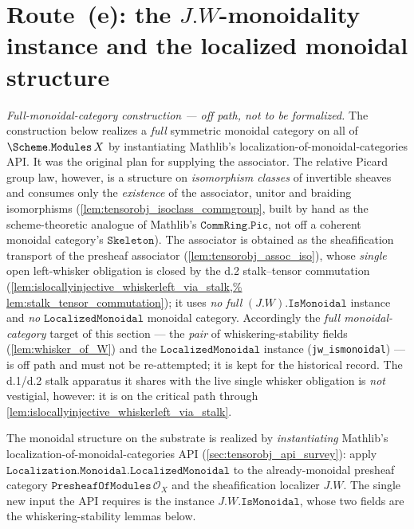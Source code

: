 \section{Route~(e): the \(J.W\)-monoidality instance and the localized monoidal structure}
\label{sec:tensorobj_route_e}

\emph{Full-monoidal-category construction --- off path, not to be formalized.} The
construction below realizes a \emph{full} symmetric monoidal category on all of
\(\Scheme.\mathtt{Modules}\,X\) by instantiating Mathlib's
localization-of-monoidal-categories API. It was the original plan for supplying the
associator. The relative Picard group law, however, is a structure on
\emph{isomorphism classes} of invertible sheaves and consumes only the
\emph{existence} of the associator, unitor and braiding isomorphisms
(\cref{lem:tensorobj_isoclass_commgroup}, built by hand as the scheme-theoretic
analogue of Mathlib's \(\mathtt{CommRing.Pic}\), not off a coherent monoidal
category's \(\mathtt{Skeleton}\)). The associator is obtained as the sheafification
transport of the presheaf associator (\cref{lem:tensorobj_assoc_iso}), whose
\emph{single} open left-whisker obligation is closed by the d.2 stalk--tensor
commutation (\cref{lem:islocallyinjective_whiskerleft_via_stalk,%
lem:stalk_tensor_commutation}); it uses \emph{no} \emph{full}
\((J.W).\mathtt{IsMonoidal}\) instance and \emph{no} \(\mathtt{LocalizedMonoidal}\)
monoidal category. Accordingly the \emph{full monoidal-category} target of this
section --- the \emph{pair} of whiskering-stability fields (\cref{lem:whisker_of_W})
and the \(\mathtt{LocalizedMonoidal}\) instance (\texttt{jw\_ismonoidal}) --- is off
path and must not be re-attempted; it is kept for the historical record. The d.1/d.2
stalk apparatus it shares with the live single whisker obligation is \emph{not}
vestigial, however: it is on the critical path through
\cref{lem:islocallyinjective_whiskerleft_via_stalk}.

The monoidal structure on the substrate is realized by \emph{instantiating}
Mathlib's localization-of-monoidal-categories API
(\cref{sec:tensorobj_api_survey}): apply
\(\mathtt{Localization.Monoidal.LocalizedMonoidal}\) to the already-monoidal
presheaf category \(\mathtt{PresheafOfModules}\,\mathcal{O}_X\) and the
sheafification localizer \(J.W\). The single new input the API requires is the
instance \(J.W.\mathtt{IsMonoidal}\), whose two fields are the
whiskering-stability lemmas below.

